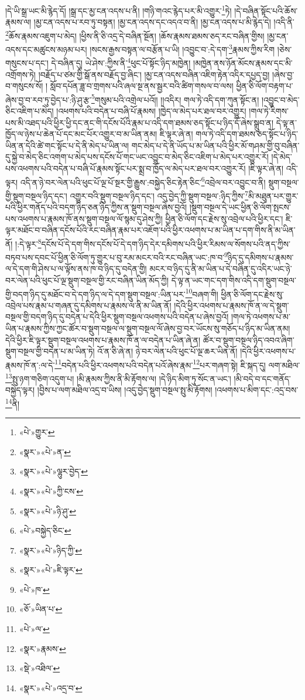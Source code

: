 །དེ་ཡི་སྒྲ་ཡང་མི་རྙེད་དོ། །སྒྲ་དང་མྱ་ངན་འདས་པ་ནི། །གཉི་གའང་རྙེད་པར་མི་འགྱུར་\footnote{«པེ་»གྱུར་}ཏེ། །དེ་བཞིན་སྟོང་པའི་ཆོས་རྣམས་ལ། །མྱ་ངན་འདས་པ་རབ་ཏུ་བསྟན། །མྱ་ངན་འདས་དང་འདའ་བ་ནི། །མྱ་ངན་འདས་པ་མི་རྙེད་དེ། །འདི་ནི་\footnote{«སྣར་»«པེ་»ན་}ཆོས་རྣམས་འཇུག་པ་མེད། །ཕྱིས་ནི་ཅི་འདྲ་དེ་བཞིན་སྔོན། །ཆོས་རྣམས་ཐམས་ཅད་རང་བཞིན་གྱིས། །མྱ་ངན་འདས་དང་མཚུངས་མཉམ་པར། །སངས་རྒྱས་བསྟན་ལ་བརྩོན་པ་ཡི། །འབྱུང་བ་:དེ་དག་\footnote{«སྣར་»«པེ་»ལྷུར་བྱེད་}རྣམས་ཀྱིས་རིག །ཅེས་གསུངས་པ་དང་། དེ་བཞིན་དུ། ཡེ་ཤེས་:ཀྱིས་ནི་\footnote{«སྣར་»«པེ་»ཀྱི་ངས་}ཕུང་པོ་སྟོང་ཉིད་མཁྱེན། །མཁྱེན་ནས་ཉོན་མོངས་རྣམས་དང་མི་འགྲོགས་ཏེ། །བརྗོད་པ་ཙམ་གྱི་སྒོ་ནས་བརྗོད་བྱ་ཞིང་། །མྱ་ངན་འདས་བཞིན་འཇིག་རྟེན་འདིར་དཔྱད་བྱ། །ཞེས་བྱ་བ་གསུངས་སོ། །
སློབ་དཔོན་ཟླ་བ་གྲགས་པའི་ཞལ་སྔ་ནས་སྦྱར་བའི་ཚིག་གསལ་བ་ལས། ཕྱིན་ཅི་ལོག་བརྟག་པ་ཞེས་བྱ་བ་རབ་ཏུ་བྱེད་པ་:ཉི་ཤུ་རྩ་\footnote{«སྣར་»«པེ་»ཉི་ཤུ་}གསུམ་པའི་འགྲེལ་པའོ།། །།འདིར། གལ་ཏེ་འདི་དག་ཀུན་སྟོང་ན། །འབྱུང་བ་མེད་ཅིང་འཇིག་པ་མེད། །འཕགས་པའི་བདེན་པ་བཞི་པོ་རྣམས། །ཁྱེད་ལ་མེད་པར་ཐལ་བར་འགྱུར། །གལ་ཏེ་རིགས་པས་མི་འཐད་པའི་ཕྱིར་ཕྱི་དང་ནང་གི་དངོས་པོའི་རྣམ་པ་འདི་དག་ཐམས་ཅད་སྟོང་པ་ཉིད་དོ་ཞེས་སྒྲུབ་ན། དེ་ལྟ་ན་ཁྱོད་ལ་ཉེས་པ་ཆེན་པོ་དང་མང་པོར་འགྱུར་བ་མ་ཡིན་ནམ། ཇི་ལྟར་ཞེ་ན། གལ་ཏེ་འདི་དག་ཐམས་ཅད་སྟོང་པ་ཉིད་ཡིན་ན་དེའི་ཚེ་གང་སྟོང་པ་དེ་ནི་མེད་པ་ཡིན་ལ། གང་མེད་པ་དེ་ནི་ཡོད་པ་མ་ཡིན་པའི་ཕྱིར་མོ་གཤམ་གྱི་བུ་བཞིན་དུ་སྐྱེ་བ་མེད་ཅིང་འགག་པ་མེད་པས་དངོས་པོ་གང་ཡང་འབྱུང་བ་མེད་ཅིང་འཇིག་པ་མེད་པར་འགྱུར་རོ། །དེ་མེད་པས་འཕགས་པའི་བདེན་པ་བཞི་པོ་རྣམས་སྟོང་པར་སྨྲ་བ་ཁྱོད་ལ་མེད་པར་ཐལ་བར་འགྱུར་རོ། །ཇི་ལྟར་ཞེ་ན། འདི་ལྟར། འདི་ན་ཉེ་བར་ལེན་པའི་ཕུང་པོ་ལྔ་པོ་སྔར་གྱི་རྒྱུས་:བསྐྱེད་ཅིང་རྟེན་ཅིང་\footnote{«པེ་»བསྐྱེད་ཅིང་}འབྲེལ་བར་འབྱུང་བ་ནི། སྡུག་བསྔལ་གྱི་སྡུག་བསྔལ་ཉིད་དང་། འགྱུར་བའི་སྡུག་བསྔལ་ཉིད་དང་། འདུ་བྱེད་ཀྱི་སྡུག་བསྔལ་:ཉིད་ཀྱིས་\footnote{«སྣར་»«པེ་»ཉིད་ཀྱི་}མི་མཐུན་པར་གྱུར་པའི་ཕྱིར་གནོད་པའི་བདག་ཉིད་ཅན་ཉིད་ཀྱིས་ན་སྡུག་བསྔལ་ཞེས་བྱའོ། །སྡུག་བསྔལ་དེ་ཡང་ཕྱིན་ཅི་ལོག་སྤངས་པས་འཕགས་པ་རྣམས་ཁོ་ནས་སྡུག་བསྔལ་ལོ་སྙམ་དུ་ཤེས་ཀྱི། ཕྱིན་ཅི་ལོག་དང་རྗེས་སུ་འབྲེལ་པའི་ཕྱིར་དང་། ཇི་ལྟར་མཐོང་བ་བཞིན་དངོས་པོའི་རང་བཞིན་རྣམ་པར་འཇོག་པའི་ཕྱིར་འཕགས་པ་མ་ཡིན་པ་དག་གིས་ནི་མ་ཡིན་ནོ། །:དེ་ལྟར་\footnote{«སྣར་»«པེ་»ཇི་ལྟར་}དངོས་པོ་དེ་དག་གིས་དངོས་པོ་དེ་དག་ཉིད་དེར་དམིགས་པའི་ཕྱིར་རིམས་ལ་སོགས་པའི་ནད་ཀྱིས་བཏབ་པས་དབང་པོ་ཕྱིན་ཅི་ལོག་ཏུ་གྱུར་པ་བུ་རམ་མངར་བའི་རང་བཞིན་ཡང་:ཁ་བ་\footnote{«པེ་»ཁ་}ཉིད་དུ་དམིགས་པ་རྣམས་ལ་དེ་དག་གི་ཤེས་པ་ལ་ལྟོས་ནས་ཁ་བ་ཉིད་དུ་བདེན་གྱི། མངར་བ་ཉིད་དུ་ནི་མ་ཡིན་པ་དེ་བཞིན་དུ་འདིར་ཡང་ཉེ་བར་ལེན་པའི་ཕུང་པོ་ལྔ་སྡུག་བསྔལ་གྱི་རང་བཞིན་ཡིན་མོད་ཀྱི། དེ་ལྟ་ན་ཡང་གང་དག་གིས་འདི་དག་སྡུག་བསྔལ་གྱི་བདག་ཉིད་དུ་མཐོང་བ་དེ་དག་ཉིད་ལ་དེ་དག་སྡུག་བསྔལ་:ཡིན་པར་\footnote{«ཅོ་»ཡིན་པ་}བཞག་གི། ཕྱིན་ཅི་ལོག་དང་རྗེས་སུ་འབྲེལ་པས་རྣམ་པ་གཞན་དུ་དམིགས་པ་རྣམས་ལ་ནི་མ་ཡིན་ནོ། །དེའི་ཕྱིར་འཕགས་པ་རྣམས་ཁོ་ན་ལ་དེ་སྡུག་བསྔལ་གྱི་བདག་ཉིད་དུ་བདེན་པ་དེའི་ཕྱིར་སྡུག་བསྔལ་འཕགས་པའི་བདེན་པ་ཞེས་བྱའོ། །གལ་ཏེ་འཕགས་པ་མ་ཡིན་པ་རྣམས་ཀྱིས་ཀྱང་ཚོར་བ་སྡུག་བསྔལ་ལ་སྡུག་བསྔལ་ལོ་ཞེས་བྱ་བར་ཡོངས་སུ་གཅོད་པ་ཉིད་མ་ཡིན་ནམ། དེའི་ཕྱིར་ཇི་ལྟར་སྡུག་བསྔལ་འཕགས་པ་རྣམས་ཁོ་ན་ལ་བདེན་པ་ཡིན་ཞེ་ན། ཚོར་བ་སྡུག་བསྔལ་ཉིད་འབའ་ཞིག་སྡུག་བསྔལ་གྱི་བདེན་པ་མ་ཡིན་ཏེ། འོ་ན་ཅི་ཞེ་ན། ཉེ་བར་ལེན་པའི་ཕུང་པོ་ལྔ་ཆར་ཡིན་ནོ། །དེའི་ཕྱིར་འཕགས་པ་རྣམས་ཁོ་ན་:ལ་དེ་\footnote{«པེ་»ལ་}བདེན་པའི་ཕྱིར་འཕགས་པའི་བདེན་པའོ་ཞེས་རྣམ་\footnote{«སྣར་»རྣམས་}པར་གཞག་སྟེ། ཇི་སྐད་དུ། ལག་མཐིལ་\footnote{«སྡེ་»འཐིལ་}སྤུ་ཉག་གཅིག་འདུག་པ། །མི་རྣམས་ཀྱིས་ནི་མི་རྟོགས་ལ། །དེ་ཉིད་མིག་ཏུ་སོང་ན་ཡང་། །མི་བདེ་བ་དང་གནོད་བསྐྱེད་ལྟར། །བྱིས་པ་ལག་མཐིལ་འདྲ་བ་ཡིས། །འདུ་བྱེད་སྡུག་བསྔལ་སྤུ་མི་རྟོགས། །འཕགས་པ་མིག་དང་:འདྲ་བས་\footnote{«སྣར་»«པེ་»འདྲ་བ་}ནི། 